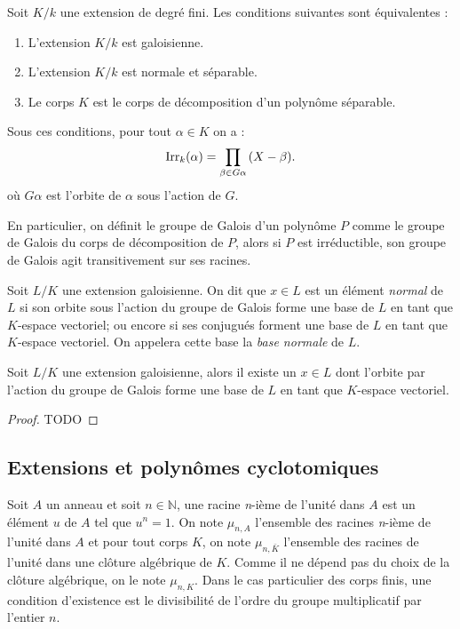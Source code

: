 \documentclass[a4paper]{article} %
\numberwithin{section}{part}
\numberwithin{equation}{section}
\newcommand\nroot[1]{\textit{#1}-ième}
\newcommand\Irr[2]{\textup{Irr}_{#1}(#2)}
\newcommand\NN{\mathbb{N}}
\begin{document}
\begin{thm}
Soit $K/k$ une extension de degré fini. Les conditions suivantes sont
équivalentes :
\begin{enumerate}
\item L'extension $K/k$ est galoisienne.
\item L'extension $K/k$ est normale et séparable.
\item Le corps $K$ est le corps de décomposition d'un polynôme séparable.
\end{enumerate}
Sous ces conditions, pour tout $\alpha\in K$ on a :
\begin{equation}
\Irr{k}{\alpha} = \prod_{\beta\in G\alpha}{(X - \beta)}.
\end{equation}
où $G\alpha$ est l'orbite de $\alpha$ sous l'action de $G$.
\end{thm}

\begin{rem}
En particulier, on définit le groupe de Galois d'un polynôme $P$ comme le
groupe de Galois du corps de décomposition de $P$, alors si $P$ est
irréductible, son groupe de Galois agit transitivement sur ses racines.
\end{rem}

\begin{defn}
\label{def:elemnorm}
Soit $L/K$ une extension galoisienne. On dit que $x\in L$ est un élément
\emph{normal} de $L$ si son orbite sous l'action du groupe de Galois forme une 
base de $L$ en tant que $K$-espace vectoriel; ou encore si ses conjugués forment
une base de $L$ en tant que $K$-espace vectoriel. On appelera cette base la 
\emph{base normale} de $L$.
\end{defn}

\begin{thm}
Soit $L/K$ une extension galoisienne, alors il existe un $x\in L$ dont l'orbite
par l'action du groupe de Galois forme une base de $L$ en tant que $K$-espace
vectoriel.
\end{thm}
\begin{proof}
TODO
\end{proof}

\subsection{Extensions et polynômes cyclotomiques}
Soit $A$ un anneau et soit $n\in\NN$, une racine \nroot{n} de l'unité dans $A$ 
est un élément $u$ de $A$ tel que $u^n = 1$. On note $\mu_{n,A}$ l'ensemble des 
racines \nroot{n} de l'unité dans $A$ et pour tout corps $K$, on note 
$\mu_{n,\bar{K}}$ l'ensemble des racines de l'unité dans une clôture algébrique 
de $K$. Comme il ne dépend pas du choix de la clôture algébrique, on le note 
$\mu_{n,K}$. Dans le cas particulier des corps finis, une condition d'existence 
est le divisibilité de l'ordre du groupe multiplicatif par l'entier $n$.\par
\end{document}
